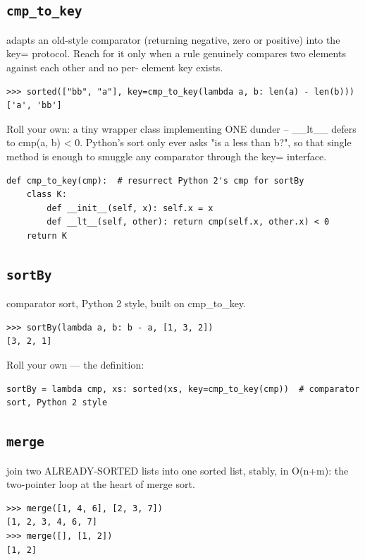 \documentclass[10pt,letterpaper]{book}
\begin{document}
\subsection{\texttt{cmp\_to\_key}}\label{def:cmp-to-key}
adapts an old-style comparator (returning negative, zero or positive) into the key= protocol. Reach for it only when a rule genuinely compares two elements against each other and no per- element key exists.
\begin{lstlisting}[style=ex]
>>> sorted(["bb", "a"], key=cmp_to_key(lambda a, b: len(a) - len(b)))
['a', 'bb']
\end{lstlisting}

Roll your own: a tiny wrapper class implementing ONE dunder -- \_\_lt\_\_ defers to cmp(a, b) < 0. Python's sort only ever asks "is a less than b?", so that single method is enough to smuggle any comparator through the key= interface.

\begin{lstlisting}[style=ex]
def cmp_to_key(cmp):  # resurrect Python 2's cmp for sortBy
    class K:
        def __init__(self, x): self.x = x
        def __lt__(self, other): return cmp(self.x, other.x) < 0
    return K
\end{lstlisting}

\subsection{\texttt{sortBy}}\label{def:sortBy}
comparator sort, Python 2 style, built on cmp\_to\_key.
\begin{lstlisting}[style=ex]
>>> sortBy(lambda a, b: b - a, [1, 3, 2])
[3, 2, 1]
\end{lstlisting}

Roll your own --- the definition:

\begin{lstlisting}[style=ex]
sortBy = lambda cmp, xs: sorted(xs, key=cmp_to_key(cmp))  # comparator sort, Python 2 style
\end{lstlisting}
\subsection{\texttt{merge}}\label{def:merge}
join two ALREADY-SORTED lists into one sorted list, stably, in O(n+m): the two-pointer loop at the heart of merge sort.
\begin{lstlisting}[style=ex]
>>> merge([1, 4, 6], [2, 3, 7])
[1, 2, 3, 4, 6, 7]
>>> merge([], [1, 2])
[1, 2]
\end{lstlisting}
\end{document}
